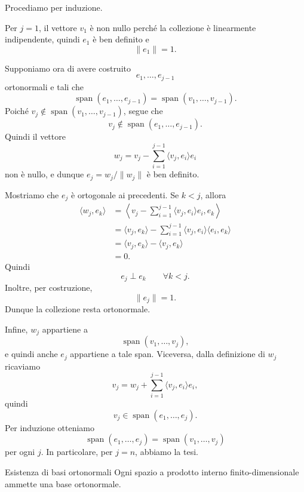 \documentclass[a4paper]{article}
\begin{document}
\begin{snippetproof}{}
    Procediamo per induzione.

    Per \(j=1\), il vettore \(v_1\) è non nullo perché la collezione è linearmente indipendente, quindi \(e_1\) è ben definito e
    \[
        \|e_1\|=1.
    \]

    Supponiamo ora di avere costruito
    \[
        e_1,\ldots,e_{j-1}
    \]
    ortonormali e tali che
    \[
        \operatorname{span}(e_1,\ldots,e_{j-1})
        =
        \operatorname{span}(v_1,\ldots,v_{j-1}).
    \]
    Poiché \(v_j\notin\operatorname{span}(v_1,\ldots,v_{j-1})\), segue che
    \[
        v_j\notin\operatorname{span}(e_1,\ldots,e_{j-1}).
    \]
    Quindi il vettore
    \[
        w_j
        =
        v_j
        -
        \sum_{i=1}^{j-1}\langle v_j,e_i\rangle e_i
    \]
    non è nullo, e dunque \(e_j=w_j/\|w_j\|\) è ben definito.

    Mostriamo che \(e_j\) è ortogonale ai precedenti. Se \(k<j\), allora
    \begin{align*}
        \langle w_j,e_k\rangle
        &=
        \left\langle
        v_j-\sum_{i=1}^{j-1}\langle v_j,e_i\rangle e_i,
        e_k
        \right\rangle\\
        &=
        \langle v_j,e_k\rangle
        -
        \sum_{i=1}^{j-1}\langle v_j,e_i\rangle\langle e_i,e_k\rangle\\
        &=
        \langle v_j,e_k\rangle-\langle v_j,e_k\rangle\\
        &=0.
    \end{align*}
    Quindi
    \[
        e_j\perp e_k
        \qquad
        \forall k<j.
    \]
    Inoltre, per costruzione,
    \[
        \|e_j\|=1.
    \]
    Dunque la collezione resta ortonormale.

    Infine, \(w_j\) appartiene a
    \[
        \operatorname{span}(v_1,\ldots,v_j),
    \]
    e quindi anche \(e_j\) appartiene a tale span. Viceversa, dalla definizione di \(w_j\) ricaviamo
    \[
        v_j
        =
        w_j+\sum_{i=1}^{j-1}\langle v_j,e_i\rangle e_i,
    \]
    quindi
    \[
        v_j\in\operatorname{span}(e_1,\ldots,e_j).
    \]
    Per induzione otteniamo
    \[
        \operatorname{span}(e_1,\ldots,e_j)
        =
        \operatorname{span}(v_1,\ldots,v_j)
    \]
    per ogni \(j\). In particolare, per \(j=n\), abbiamo la tesi.
\end{snippetproof}

\begin{snippetcorollary}{Esistenza di basi ortonormali}
    Ogni spazio a prodotto interno finito-dimensionale ammette una base ortonormale.
\end{snippetcorollary}
\end{document}
